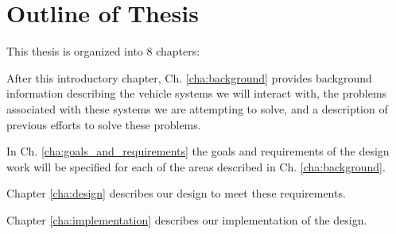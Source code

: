 \section{Outline of Thesis}

This thesis is organized into 8 chapters:

After this introductory chapter, Ch. \ref{cha:background} provides background information describing the vehicle systems we will interact with, the problems associated with these systems we are attempting to solve, and a description of previous efforts to solve these problems. 

In Ch. \ref{cha:goals_and_requirements} the goals and requirements of the design work will be specified for each of the areas described in Ch. \ref{cha:background}. 

Chapter \ref{cha:design} describes our design to meet these requirements. 

Chapter \ref{cha:implementation} describes our implementation of the design.
